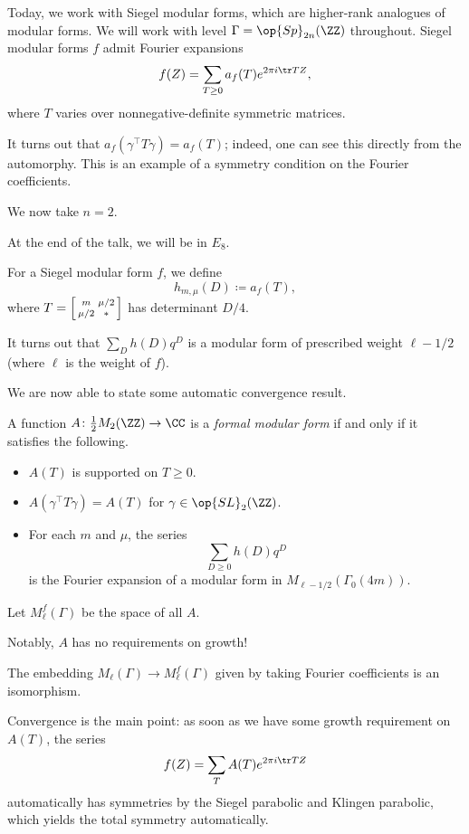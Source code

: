 \documentclass{article}
\begin{document}
Today, we work with Siegel modular forms, which are higher-rank analogues of modular forms. We will work with level $\Gamma=\op{Sp}_{2n}(\ZZ)$ throughout. Siegel modular forms $f$ admit Fourier expansions
\[f(Z)=\sum_{T\ge0}a_f(T)e^{2\pi i\tr TZ},\]
where $T$ varies over nonnegative-definite symmetric matrices.
\begin{remark}
	It turns out that $a_f(\gamma^\intercal T\gamma)=a_f(T)$; indeed, one can see this directly from the automorphy. This is an example of a symmetry condition on the Fourier coefficients.
\end{remark}
We now take $n=2$.
\begin{remark}[Pollack]
	At the end of the talk, we will be in $E_8$.
\end{remark}
\begin{notation}
	For a Siegel modular form $f$, we define
	\[h_{m,\mu}(D)\coloneqq a_f(T),\]
	where $T=\begin{bsmallmatrix}
		m & \mu/2 \\ \mu/2 & *
	\end{bsmallmatrix}$ has determinant $D/4$.
\end{notation}
\begin{remark}
	It turns out that $\sum_Dh(D)q^D$ is a modular form of prescribed weight $\ell-1/2$ (where $\ell$ is the weight of $f$).
\end{remark}
We are now able to state some automatic convergence result.
\begin{definition}
	A function $A\colon\frac12M_2(\ZZ)\to\CC$ is a \textit{formal modular form} if and only if it satisfies the following.
	\begin{itemize}
		\item $A(T)$ is supported on $T\ge0$.
		\item $A(\gamma^\intercal T\gamma)=A(T)$ for $\gamma\in\op{SL}_2(\ZZ)$.
		\item For each $m$ and $\mu$, the series
		\[\sum_{D\ge0}h(D)q^D\]
		is the Fourier expansion of a modular form in $M_{\ell-1/2}(\Gamma_0(4m))$.
	\end{itemize}
	Let $M_\ell^f(\Gamma)$ be the space of all $A$.
\end{definition}
Notably, $A$ has no requirements on growth!
\begin{theorem}
	The embedding $M_\ell(\Gamma)\to M_\ell^f(\Gamma)$ given by taking Fourier coefficients is an isomorphism.
\end{theorem}
\begin{remark}
	Convergence is the main point: as soon as we have some growth requirement on $A(T)$, the series
	\[f(Z)=\sum_TA(T)e^{2\pi i\tr TZ}\]
	automatically has symmetries by the Siegel parabolic and Klingen parabolic, which yields the total symmetry automatically.
\end{remark}
\end{document}
